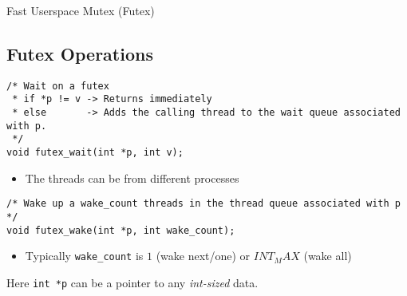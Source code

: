 \begin{definitionbox}{Fast Userspace Mutex (Futex)}
  
\end{definitionbox}

\subsection{Futex Operations}
\begin{verbatim}
/* Wait on a futex
 * if *p != v -> Returns immediately
 * else       -> Adds the calling thread to the wait queue associated with p.
 */
void futex_wait(int *p, int v);
\end{verbatim}
\begin{itemize}
  \item The threads can be from different processes
\end{itemize}


\begin{verbatim}
/* Wake up a wake_count threads in the thread queue associated with p */
void futex_wake(int *p, int wake_count);
\end{verbatim}
\begin{itemize}
  \item Typically \texttt{wake_count} is $1$ (wake next/one) or $INT_MAX$ (wake all)
\end{itemize}

Here \texttt{int *p} can be a pointer to any \textit{int-sized} data.

